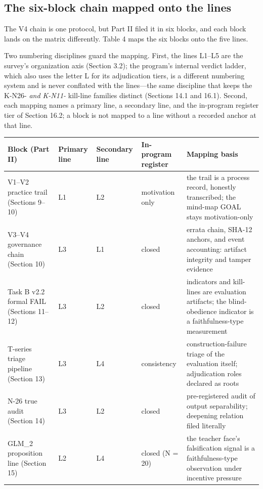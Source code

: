\documentclass[11pt]{article}
\begin{document}
\subsection{The six-block chain mapped onto the lines}
\noindent The V4 chain is one protocol, but Part II filed it in six blocks, and each block lands on the matrix differently. Table 4 maps the six blocks onto the five lines.\par
\noindent Two numbering disciplines guard the mapping. First, the lines L1–L5 are the survey's organization axis (Section 3.2); the program's internal verdict ladder, which also uses the letter L for its adjudication tiers, is a different numbering system and is never conflated with the lines—the same discipline that keeps the K-N26-\emph{ and K-N11-} kill-line families distinct (Sections 14.1 and 16.1). Second, each mapping names a primary line, a secondary line, and the in-program register tier of Section 16.2; a block is not mapped to a line without a recorded anchor at that line.\par
\begingroup\footnotesize
\noindent\begin{tabularx}{\textwidth}{@{}l l l p{} >{\raggedright\arraybackslash}X@{}}
\toprule
\textbf{Block (Part II)} & \textbf{Primary line} & \textbf{Secondary line} & \textbf{In-program register} & \textbf{Mapping basis} \\
\midrule
V1–V2 practice trail (Sections 9–10) & L1 & L2 & motivation only & the trail is a process record, honestly transcribed; the mind-map GOAL stays motivation-only \\
V3–V4 governance chain (Section 10) & L3 & L1 & closed & errata chain, SHA-12 anchors, and event accounting: artifact integrity and tamper evidence \\
Task B v2.2 formal FAIL (Sections 11–12) & L3 & L2 & closed & indicators and kill-lines are evaluation artifacts; the blind-obedience indicator is a faithfulness-type measurement \\
T-series triage pipeline (Section 13) & L3 & L4 & consistency & construction-failure triage of the evaluation itself; adjudication roles declared as roots \\
N-26 true audit (Section 14) & L3 & L2 & closed & pre-registered audit of output separability; deepening relation filed literally \\
GLM\_2 proposition line (Section 15) & L2 & L4 & closed (N = 20) & the teacher face's falsification signal is a faithfulness-type observation under incentive pressure \\
\bottomrule
\end{tabularx}
\end{document}
